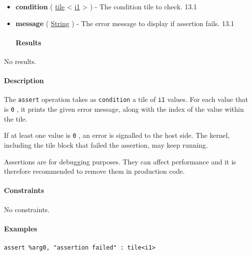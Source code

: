 \documentclass{article}
\begin{document}
\begin{itemize}
\item \textbf{condition} ( \href{https://docs.nvidia.com/cuda/tile-ir/latest/sections/types.html#type-tile}{tile} < \href{https://docs.nvidia.com/cuda/tile-ir/latest/sections/types.html#subsection-element-types}{i1} > ) - The condition tile to check. 13.1
\item \textbf{message} ( \href{https://docs.nvidia.com/cuda/tile-ir/latest/sections/operations.html#type-string}{String} ) - The error message to display if assertion fails. 13.1


\paragraph{Results}

\end{itemize}
No results.



\paragraph{Description}

The \texttt{assert} operation takes as \texttt{condition} a tile of \texttt{i1} values. For each value that is \texttt{0} , it prints the given error message, along with the index of the value within the tile.


If at least one value is \texttt{0} , an error is signalled to the host side. The kernel, including the tile block that failed the assertion, may keep running.


Assertions are for debugging purposes. They can affect performance and it is therefore recommended to remove them in production code.



\paragraph{Constraints}

No constraints.



\paragraph{Examples}

\begin{lstlisting}
assert %arg0, "assertion failed" : tile<i1>
\end{lstlisting}
\end{document}
